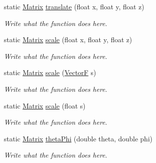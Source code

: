 \begin{DoxyCompactItemize}
static \hyperlink{classMatrix}{Matrix} \hyperlink{classMatrix_a77d32ea082434b9b04374af58f3d7007}{translate} (float x, float y, float z)
\begin{DoxyCompactList}\small\item\em Write what the function does here. \end{DoxyCompactList}\item 
static \hyperlink{classMatrix}{Matrix} \hyperlink{classMatrix_a1f36f7f62b8e99fea99880b6fc80a604}{scale} (float x, float y, float z)
\begin{DoxyCompactList}\small\item\em Write what the function does here. \end{DoxyCompactList}\item 
static \hyperlink{classMatrix}{Matrix} \hyperlink{classMatrix_a3420c2adfcea1a4ef5ae86d6875ef75e}{scale} (\hyperlink{structVectorF}{Vector\+F} s)
\begin{DoxyCompactList}\small\item\em Write what the function does here. \end{DoxyCompactList}\item 
static \hyperlink{classMatrix}{Matrix} \hyperlink{classMatrix_a1205b0fb62536a9b18a2c4ef6fc6a316}{scale} (float s)
\begin{DoxyCompactList}\small\item\em Write what the function does here. \end{DoxyCompactList}\item 
static \hyperlink{classMatrix}{Matrix} \hyperlink{classMatrix_a8198676e0d8fdc3d447f184260af7057}{theta\+Phi} (double theta, double phi)
\begin{DoxyCompactList}\small\item\em Write what the function does here. \end{DoxyCompactList}\end{DoxyCompactItemize}
